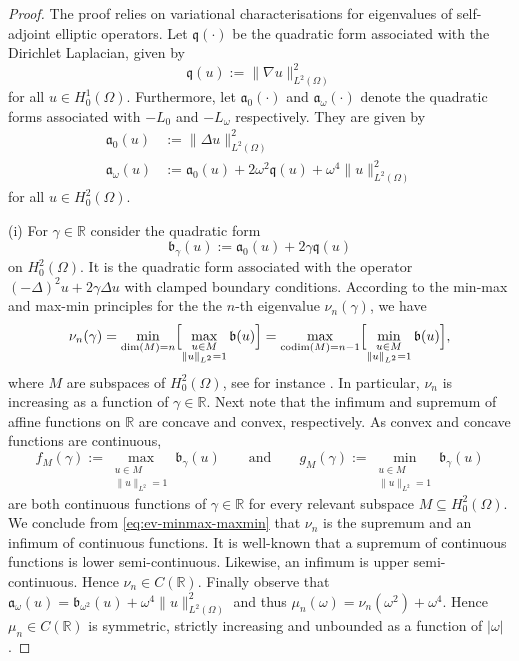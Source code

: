 \documentclass[a4paper, reqno]{amsart}
\numberwithin{equation}{section}
\theoremstyle{plain}
\theoremstyle{definition}
\theoremstyle{remark}
\DeclareMathOperator{\codim}{codim}
\newcommand{\mfra}{\mathfrak{a}}
\newcommand{\mfrb}{\mathfrak{b}}
\newcommand{\mfrq}{\mathfrak{q}}
\newcommand{\RR}{\mathbb{R}}
\begin{document}
\begin{proof}
  The proof relies on variational characterisations for eigenvalues of self-adjoint elliptic operators. Let $\mfrq(\cdot)$ be the quadratic form associated with the Dirichlet Laplacian, given by
  \begin{equation*}
    \mfrq(u):=\|\nabla u\|_{L^2(\Omega)}^2
  \end{equation*}
  for all $u\in H_0^1(\Omega)$. Furthermore, let $\mfra_0(\cdot)$ and $\mfra_\omega(\cdot)$ denote the quadratic forms associated with $-L_0$ and $-L_\omega$ respectively. They are given by
  \begin{equation*}
    \begin{aligned}
      \mfra_0(u)      & := \|\Delta u\|_{L^2(\Omega)}^2                                   \\
      \mfra_\omega(u) & := \mfra_0(u) + 2 \omega^2\mfrq(u)+\omega^4 \|u\|_{L^2(\Omega)}^2
    \end{aligned}
  \end{equation*}
  for all $u\in H_0^2(\Omega)$.

  (i) For $\gamma\in\RR$ consider the quadratic form
  \begin{equation*}
    \mfrb_\gamma(u) := \mfra_0(u)+ 2 \gamma\mfrq(u)
  \end{equation*}
  on $H_0^2(\Omega)$. It is the quadratic form associated with the operator $(-\Delta)^2 u+2\gamma\Delta u$ with clamped boundary conditions. According to the min-max and max-min principles for the the $n$-th eigenvalue $\nu_n(\gamma)$, we have
  \begin{equation}
    \label{eq:ev-minmax-maxmin}
    \nu_n(\gamma)
    =\min_{\dim(M)=n}\Bigl[\max_{\substack{u\in M\\\|u\|_{L^2}=1}}\mfrb(u)\Bigr]
    =\max_{\codim(M)=n-1}\Bigl[\min_{\substack{u\in M\\\|u\|_{L^2}=1}}\mfrb(u)\Bigr],
  \end{equation}
  where $M$ are subspaces of $H_0^2(\Omega)$, see for instance \cite[Chapters~2 and~3]{WS72}. In particular, $\nu_n$ is increasing as a function of $\gamma\in\RR$. Next note that the infimum and supremum of affine functions on $\RR$ are concave and convex, respectively. As convex and concave functions are continuous,
  \begin{equation*}
    f_M(\gamma):=\max_{\substack{u\in M\\\|u\|_{L^2}=1}}\mfrb_\gamma(u)
    \qquad\text{and}\qquad
    g_M(\gamma):=\min_{\substack{u\in M\\\|u\|_{L^2}=1}}\mfrb_\gamma(u)
  \end{equation*}
  are both continuous functions of $\gamma\in\RR$ for every relevant subspace $M\subseteq H_0^2(\Omega)$. We conclude from \eqref{eq:ev-minmax-maxmin} that $\nu_n$ is the supremum and an infimum of continuous functions. It is well-known that a supremum of continuous functions is lower semi-continuous. Likewise, an infimum is upper semi-continuous. Hence $\nu_n\in C(\RR)$. Finally observe that $\mfra_\omega(u)=\mfrb_{\omega^2}(u)+\omega^4\|u\|_{L^2(\Omega)}^2$ and thus $\mu_n(\omega)=\nu_n(\omega^2)+\omega^4$. Hence $\mu_n\in C(\RR)$ is symmetric, strictly increasing and unbounded as a function of $|\omega|$.


\end{proof}
\end{document}
